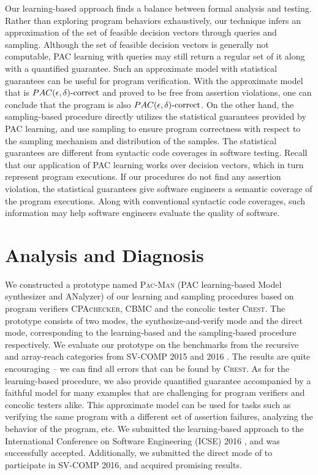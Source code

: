 Our learning-based approach finds a balance between formal analysis and testing. Rather than exploring program behaviors exhaustively, our technique infers an approximation of the set of feasible decision vectors through queries and sampling. Although the set of feasible decision vectors is generally not computable, PAC learning with queries may still return a regular set of it along with a quantified guarantee. Such an approximate model with statistical guarantees can be useful for program verification. With the approximate model that is $PAC(\epsilon, \delta)\text{-correct}$ and proved to be free from assertion violations, one can conclude that the program is also $PAC(\epsilon, \delta)\text{-correct}$. On the other hand, the sampling-based procedure directly utilizes the statistical guarantees provided by PAC learning, and use sampling to ensure program correctness with respect to the sampling mechanism and distribution of the samples. The statistical guarantees are different from syntactic code coverages in software testing. Recall that our application of PAC learning works over decision vectors, which in turn represent program executions. If our procedures do not find any assertion violation, the statistical guarantees give software engineers a semantic coverage of the program executions. Along with conventional syntactic code coverages, such information may help software engineers evaluate the quality of software.

\section{Analysis and Diagnosis}\label{sec:analysis_diagnosis}

We constructed a prototype named \textsc{Pac-Man} (PAC learning-based Model synthesizer and ANalyzer) of our learning and sampling procedures based on program verifiers \textsc{CPAchecker, CBMC} and the concolic tester \textsc{Crest}. The prototype consists of two modes, the synthesize-and-verify mode and the direct mode, corresponding to the learning-based and the sampling-based procedure respectively. We evaluate our prototype on the benchmarks from the recursive and  array-reach categories from SV-COMP 2015 \cite{svcomp15} and 2016 \cite{svcomp16}. The results are quite encouraging -- we can find all errors that can be found by \textsc{Crest}. As for the learning-based procedure, we also provide quantified guarantee accompanied by a faithful model for many examples that are challenging for program verifiers and concolic testers alike. This approximate model can be used for tasks such as verifying the same program with a different set of assertion failures, analyzing the behavior of the program, etc. We submitted the learning-based approach to the International Conference on Software Engineering (ICSE) 2016 \cite{icse2016}, and was successfully accepted. Additionally, we submitted the direct mode of \PACMAN to participate in SV-COMP 2016, and acquired promising results. 

